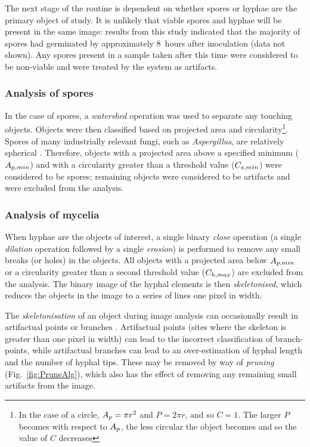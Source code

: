 The next stage of the routine is dependent on whether spores or hyphae are the primary object of study. It is unlikely that viable spores and hyphae will be present in the same image: results from this study indicated that the majority of spores had germinated by approximately 8~hours after inoculation (data not shown). Any spores present in a sample taken after this time were considered to be non-viable and were treated by the system as artifacts.

\subsubsection{Analysis of spores}

In the case of spores,  a \emph{watershed} operation was used to separate any touching objects. Objects were then classified based on projected area and circularity\footnote{In the case of a circle, $A_p=\pi r^2$ and $P=2\pi r$, and so $C=1$. The larger $P$ becomes with respect to $A_p$, the less circular the object becomes and so the value of $C$ decreases}. Spores of many industrially relevant fungi, such as \emph{Aspergillus}, are relatively spherical \cite{spohr1998}. Therefore, objects with a projected area above a specified minimum ($A_{p,min}$) and with a circularity greater than a threshold value ($C_{s,min}$) were considered to be spores; remaining objects were considered to be artifacts and were excluded from the analysis.

\subsubsection{Analysis of mycelia}

When hyphae are the objects of interest, a single binary \emph{close} operation (a single \emph{dilation} operation followed by a single \emph{erosion}) is performed to remove any small breaks (or holes) in the objects. All objects with a projected area below $A_{p,min}$ or a circularity greater than a second threshold value ($C_{h,max}$) are excluded from the analysis. The binary image of the hyphal elements is then \emph{skeletonised}, which reduces the objects in the image to a series of lines one pixel in width.

The \emph{skeletonisation} of an object during image analysis can occasionally result in artifactual points or branches \cite{packer1990,drouin1997,spohr1998}. Artifactual points (sites where the skeleton is greater than one pixel in width) can lead to the incorrect classification of branch-points, while artifactual branches can lead to an over-estimation of hyphal length and the number of hyphal tips. These may be removed by way of \emph{pruning} (Fig.~\ref{fig:PruneAlg}), which also has the effect of removing any remaining small artifacts from the image. 

